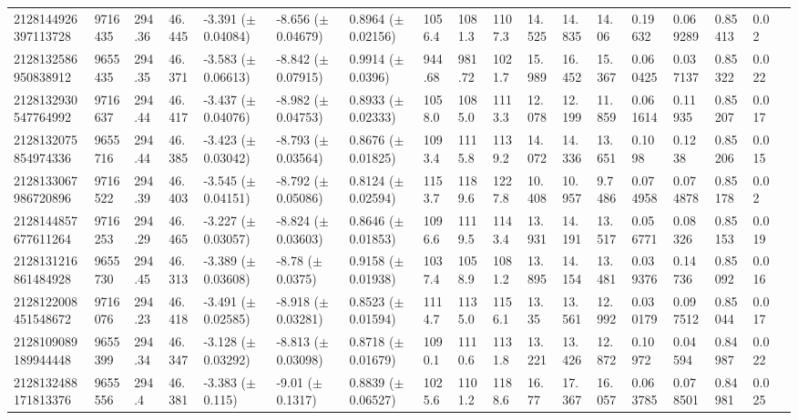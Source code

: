 \begin{sidewaystable}[htbp]
{\begin{tabular}{llllllllllllllllll}
        2128144926397113728 & 9716435 & 294.36 & 46.445 & -3.391 ($\pm$ 0.04084) & -8.656 ($\pm$ 0.04679) & 0.8964 ($\pm$ 0.02156) & 1056.4 & 1081.3 & 1107.3 & 14.525 & 14.835 & 14.06 & 0.19632 & 0.069289 & 0.85413 & 0.02 & \\
        2128132586950838912 & 9655435 & 294.35 & 46.371 & -3.583 ($\pm$ 0.06613) & -8.842 ($\pm$ 0.07915) & 0.9914 ($\pm$ 0.0396) & 944.68 & 981.72 & 1021.7 & 15.989 & 16.452 & 15.367 & 0.060425 & 0.037137 & 0.85322 & 0.022 & \\
        2128132930547764992 & 9716637 & 294.44 & 46.417 & -3.437 ($\pm$ 0.04076) & -8.982 ($\pm$ 0.04753) & 0.8933 ($\pm$ 0.02333) & 1058.0 & 1085.0 & 1113.3 & 12.078 & 12.199 & 11.859 & 0.061614 & 0.11935 & 0.85207 & 0.017 & \\
        2128132075854974336 & 9655716 & 294.44 & 46.385 & -3.423 ($\pm$ 0.03042) & -8.793 ($\pm$ 0.03564) & 0.8676 ($\pm$ 0.01825) & 1093.4 & 1115.8 & 1139.2 & 14.072 & 14.336 & 13.651 & 0.1098 & 0.1238 & 0.85206 & 0.015 & \\
        2128133067986720896 & 9716522 & 294.39 & 46.403 & -3.545 ($\pm$ 0.04151) & -8.792 ($\pm$ 0.05086) & 0.8124 ($\pm$ 0.02594) & 1153.7 & 1189.6 & 1227.8 & 10.408 & 10.957 & 9.7486 & 0.074958 & 0.074878 & 0.85178 & 0.02 & \\
        2128144857677611264 & 9716253 & 294.29 & 46.465 & -3.227 ($\pm$ 0.03057) & -8.824 ($\pm$ 0.03603) & 0.8646 ($\pm$ 0.01853) & 1096.6 & 1119.5 & 1143.4 & 13.931 & 14.191 & 13.517 & 0.056771 & 0.08326 & 0.85153 & 0.019 & \\
        2128131216861484928 & 9655730 & 294.45 & 46.313 & -3.389 ($\pm$ 0.03608) & -8.78 ($\pm$ 0.0375) & 0.9158 ($\pm$ 0.01938) & 1037.4 & 1058.9 & 1081.2 & 13.895 & 14.154 & 13.481 & 0.039376 & 0.14736 & 0.85092 & 0.016 & \\
        2128122008451548672 & 9716076 & 294.23 & 46.418 & -3.491 ($\pm$ 0.02585) & -8.918 ($\pm$ 0.03281) & 0.8523 ($\pm$ 0.01594) & 1114.7 & 1135.0 & 1156.1 & 13.35 & 13.561 & 12.992 & 0.030179 & 0.097512 & 0.85044 & 0.017 & \\
        2128109089189944448 & 9655399 & 294.34 & 46.347 & -3.128 ($\pm$ 0.03292) & -8.813 ($\pm$ 0.03098) & 0.8718 ($\pm$ 0.01679) & 1090.1 & 1110.6 & 1131.8 & 13.221 & 13.426 & 12.872 & 0.10972 & 0.04594 & 0.84987 & 0.022 & \\
        2128132488171813376 & 9655556 & 294.4 & 46.381 & -3.383 ($\pm$ 0.115) & -9.01 ($\pm$ 0.1317) & 0.8839 ($\pm$ 0.06527) & 1025.6 & 1101.2 & 1188.6 & 16.77 & 17.367 & 16.057 & 0.063785 & 0.078501 & 0.84981 & 0.025 & \\

\end{tabular}}
\end{sidewaystable}
